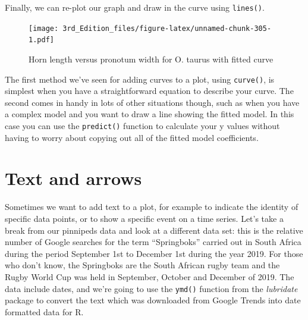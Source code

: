 \documentclass[
]{book}
\newenvironment{Shaded}{\begin{snugshade}}{\end{snugshade}}
\newcommand{\DataTypeTok}[1]{\textcolor[rgb]{0.13,0.29,0.53}{#1}}
\newcommand{\KeywordTok}[1]{\textcolor[rgb]{0.13,0.29,0.53}{\textbf{#1}}}
\newcommand{\NormalTok}[1]{#1}
\newcommand{\OperatorTok}[1]{\textcolor[rgb]{0.81,0.36,0.00}{\textbf{#1}}}
\newcommand{\StringTok}[1]{\textcolor[rgb]{0.31,0.60,0.02}{#1}}
\begin{document}
Finally, we can re-plot our graph and draw in the curve using \texttt{lines()}.

\begin{Shaded}
\end{Shaded}

\begin{figure}
\centering
\texttt{[image: 3rd\_Edition\_files/figure-latex/unnamed-chunk-305-1.pdf]}
\caption{\label{fig:unnamed-chunk-305}Horn length versus pronotum width for O. taurus with fitted curve}
\end{figure}

The first method we've seen for adding curves to a plot, using \texttt{curve()}, is simplest when you have a straightforward equation to describe your curve. The second comes in handy in lots of other situations though, such as when you have a complex model and you want to draw a line showing the fitted model. In this case you can use the \texttt{predict()} function to calculate your y values without having to worry about copying out all of the fitted model coefficients.

\hypertarget{text-and-arrows}{%
\section{Text and arrows}\label{text-and-arrows}}

Sometimes we want to add text to a plot, for example to indicate the identity of specific data points, or to show a specific event on a time series. Let's take a break from our pinnipeds data and look at a different data set: this is the relative number of Google searches for the term ``Springboks'' carried out in South Africa during the period September 1st to December 1st during the year 2019. For those who don't know, the Springboks are the South African rugby team and the Rugby World Cup was held in September, October and December of 2019. The data include dates, and we're going to use the \texttt{ymd()} function from the \emph{lubridate} package to convert the text which was downloaded from Google Trends into date formatted data for R.
\end{document}
